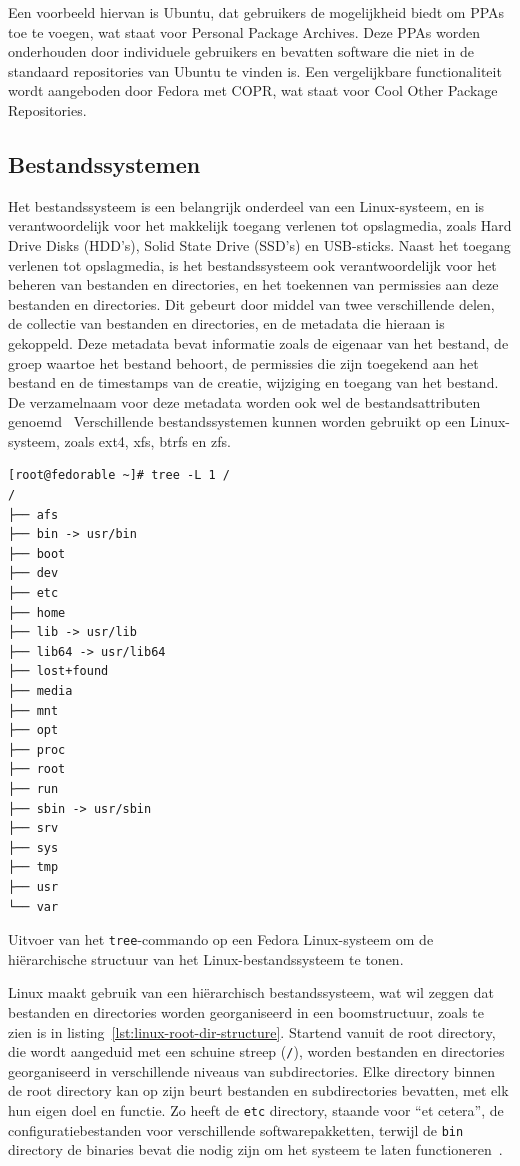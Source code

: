 Een voorbeeld hiervan is Ubuntu, dat gebruikers de mogelijkheid biedt om PPAs toe te voegen, wat staat voor Personal Package Archives.
Deze PPAs worden onderhouden door individuele gebruikers en bevatten software die niet in de standaard repositories van Ubuntu te vinden is.
Een vergelijkbare functionaliteit wordt aangeboden door Fedora met COPR, wat staat voor Cool Other Package Repositories.

\subsection{Bestandssystemen}
\label{linux_bestandssystemen}

Het bestandssysteem is een belangrijk onderdeel van een Linux-systeem, en is verantwoordelijk voor het makkelijk toegang verlenen tot opslagmedia, zoals Hard Drive Disks (HDD's), Solid State Drive (SSD's) en USB-sticks.
Naast het toegang verlenen tot opslagmedia, is het bestandssysteem ook verantwoordelijk voor het beheren van bestanden en directories, en het toekennen van permissies aan deze bestanden en directories.
Dit gebeurt door middel van twee verschillende delen, de collectie van bestanden en directories, en de metadata die hieraan is gekoppeld.
Deze metadata bevat informatie zoals de eigenaar van het bestand, de groep waartoe het bestand behoort, de permissies die zijn toegekend aan het bestand en de timestamps van de creatie, wijziging en toegang van het bestand.
De verzamelnaam voor deze metadata worden ook wel de bestandsattributen genoemd~\autocite{silberschatz2013os}
Verschillende bestandssystemen kunnen worden gebruikt op een Linux-systeem, zoals ext4, xfs, btrfs en zfs.

\begin{listing}
  \begin{verbatim}
[root@fedorable ~]# tree -L 1 /
/
├── afs
├── bin -> usr/bin
├── boot
├── dev
├── etc
├── home
├── lib -> usr/lib
├── lib64 -> usr/lib64
├── lost+found
├── media
├── mnt
├── opt
├── proc
├── root
├── run
├── sbin -> usr/sbin
├── srv
├── sys
├── tmp
├── usr
└── var
  \end{verbatim}
    \caption[Hi\"{e}rarchische structuur van Linux-bestandssysteem.]{Uitvoer van het \texttt{tree}-commando op een Fedora Linux-systeem om de hi\"erarchische structuur van het Linux-bestandssysteem te tonen.}
  \label{lst:linux-root-dir-structure}
\end{listing}

Linux maakt gebruik van een hi\"erarchisch bestandssysteem, wat wil zeggen dat bestanden en directories worden georganiseerd in een boomstructuur, zoals te zien is in listing~\ref{lst:linux-root-dir-structure}.
Startend vanuit de root directory, die wordt aangeduid met een schuine streep (\texttt{/}), worden bestanden en directories georganiseerd in verschillende niveaus van subdirectories.
Elke directory binnen de root directory kan op zijn beurt bestanden en subdirectories bevatten, met elk hun eigen doel en functie.
Zo heeft de \texttt{etc} directory, staande voor ``et cetera'', de configuratiebestanden voor verschillende softwarepakketten, terwijl de \texttt{bin} directory de binaries bevat die nodig zijn om het systeem te laten functioneren~\autocite{linuxfoundation-filesystem}.

